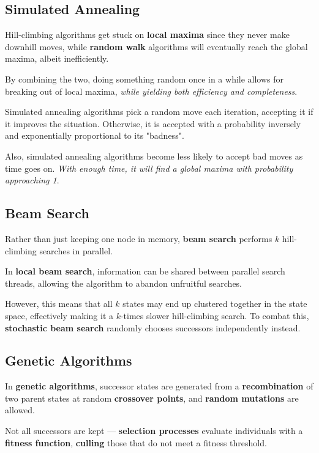 \begin{multicols*}{2}
        \subsection{Simulated Annealing}
            Hill-climbing algorithms get stuck on \textbf{local maxima} since they never make downhill moves, while \textbf{random walk} algorithms will eventually reach the global maxima, albeit inefficiently.

            By combining the two, doing something random once in a while allows for breaking out of local maxima, \emph{while yielding both efficiency and completeness}.

            Simulated annealing algorithms pick a random move each iteration, accepting it if it improves the situation. Otherwise, it is accepted with a probability inversely and exponentially proportional to its "badness".

            Also, simulated annealing algorithms become less likely to accept bad moves as time goes on. \emph{With enough time, it will find a global maxima with probability approaching 1}.

        \subsection{Beam Search}
            Rather than just keeping one node in memory, \textbf{beam search} performs $k$ hill-climbing searches in parallel.

            In \textbf{local beam search}, information can be shared between parallel search threads, allowing the algorithm to abandon unfruitful searches.

            However, this means that all $k$ states may end up clustered together in the state space, effectively making it a $k$-times slower hill-climbing search. To combat this, \textbf{stochastic beam search} randomly chooses successors independently instead.

        \subsection{Genetic Algorithms}
            In \textbf{genetic algorithms}, successor states are generated from a \textbf{recombination} of two parent states at random \textbf{crossover points}, and \textbf{random mutations} are allowed.

            Not all successors are kept --- \textbf{selection processes} evaluate individuals with a \textbf{fitness function}, \textbf{culling} those that do not meet a fitness threshold.


\end{multicols*}
